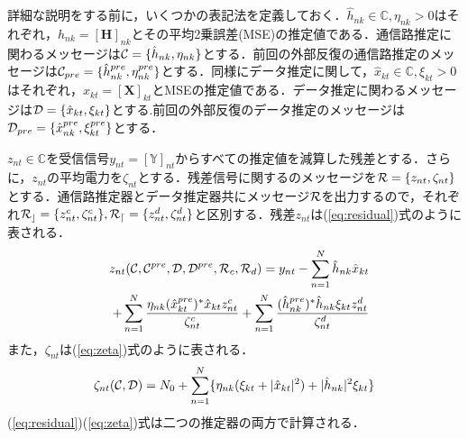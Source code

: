 \documentclass{jarticle}
\begin{document}
詳細な説明をする前に，いくつかの表記法を定義しておく．$\hat{h}_{nk}\in\mathbb{C},\eta_{nk} >0$はそれぞれ，$h_{nk}=[\boldsymbol{H}]_{nk}$とその平均2乗誤差(MSE)の推定値である．通信路推定に関わるメッセージは${\cal C}=\{\hat{h}_{nk},\eta_{nk}\}$とする．前回の外部反復の通信路推定のメッセージは${\cal C}_{pre}=\{\hat{h}_{nk}^{pre},\eta_{nk}^{pre}\}$とする．同様にデータ推定に関して，$\hat{x}_{kt}\in\mathbb{C},\xi_{kt}>0$はそれぞれ，$x_{kt}=[\boldsymbol{X}]_{kt}$とMSEの推定値である．データ推定に関わるメッセージは${\cal D}=\{\hat{x}_{kt},\xi_{kt}\}$とする.前回の外部反復のデータ推定のメッセージは${\cal D}_{pre}=\{\hat{x}_{nk}^{pre},\xi_{kt}^{pre}\}$とする．

$z_{nt}\in\mathbb{C}$を受信信号$y_{nt}=[\mathbb{Y}]_{nt}$からすべての推定値を減算した残差とする．さらに，$z_{nt}$の平均電力を$\zeta_{nt}$とする．残差信号に関するのメッセージを${\cal R}=\{ z_{nt},\zeta_{nt}\}$とする．通信路推定器とデータ推定器共にメッセージ${\cal R}$を出力するので，それぞれ${\cal R_{c}}=\{ z_{nt}^{c},\zeta_{nt}^{c}\},{\cal R_{d}}=\{ z_{nt}^{d},\zeta_{nt}^{d}\}$と区別する．残差$z_{nt}$は(\ref{eq:residual})式のように表される．
\begin{equation}
    \label{eq:residual}
    \begin{split}
    z_{nt}({\cal C},{\cal C}^{pre},{\cal D},{\cal D}^{pre},{\cal R}_{c},{\cal R}_{d}) = y_{nt} - \sum_{n=1}^{N}\hat{h}_{nk} \hat{x}_{kt} \\
    \quad +\sum_{n=1}^{N}\frac{\eta_{nk}(\hat{x}_{kt}^{pre})^{*}\hat{x}_{kt}z^{c}_{nt}}{\zeta_{nt}^{c}}+\sum_{n=1}^{N}\frac{(\hat{h}_{nk}^{pre})^{*}\hat{h}_{nk}\xi_{kt}z^{d}_{nt}}{\zeta_{nt}^{d}} 
    \end{split}
\end{equation}
また，$\zeta_{nt}$は(\ref{eq:zeta})式のように表される．
\begin{equation}
    \label{eq:zeta}
    \zeta_{nt}({\cal C},{\cal D}) = N_{0} + \sum_{n=1}^{N}\{\eta_{nk}(\xi_{kt}+|\hat{x}_{kt}|^2)+|\hat{h}_{nk}|^2\xi_{kt}\}
\end{equation}
(\ref{eq:residual})(\ref{eq:zeta})式は二つの推定器の両方で計算される．
\end{document}
